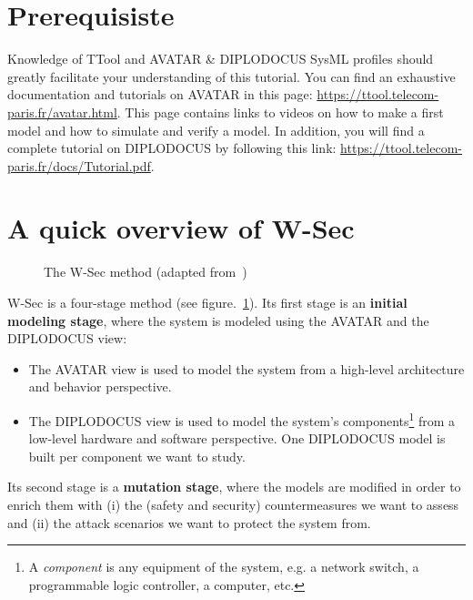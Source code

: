 \documentclass{article}
\begin{document}
\section{Prerequisiste}

Knowledge of TTool and AVATAR \& DIPLODOCUS SysML profiles should greatly facilitate your understanding of this tutorial. 
You can find an exhaustive documentation and tutorials on AVATAR in this page: \url{https://ttool.telecom-paris.fr/avatar.html}. 
This page contains links to videos on how to make a first model and how to simulate and verify a model.
In addition, you will find a complete tutorial on DIPLODOCUS by following this link: \url{https://ttool.telecom-paris.fr/docs/Tutorial.pdf}.



\section{A quick overview of W-Sec}

\begin{figure}[t]
	\hspace*{-2cm}
	\centering
	
	\caption{The W-Sec method (adapted from~\cite{wsec})}
	\label{fig:method}
\end{figure}

W-Sec is a four-stage method (see figure.~\ref{fig:method}). Its first stage is an \textbf{initial modeling stage}, where the system is modeled using the AVATAR and the DIPLODOCUS view:
\begin{itemize}
	\item The AVATAR view is used to model the system from a high-level architecture and behavior perspective.
	\item The DIPLODOCUS view is used to model the system's components\footnote{A \emph{component} is any equipment of the system, e.g. a network switch, a programmable logic controller, a computer, etc.} from a low-level hardware and software perspective. One DIPLODOCUS model is built per component we want to study.
\end{itemize}

Its second stage is a \textbf{mutation stage}, where the models are modified in order to enrich them with (i) the (safety and security) countermeasures we want to assess and (ii) the attack scenarios we want to protect the system from.
\end{document}
